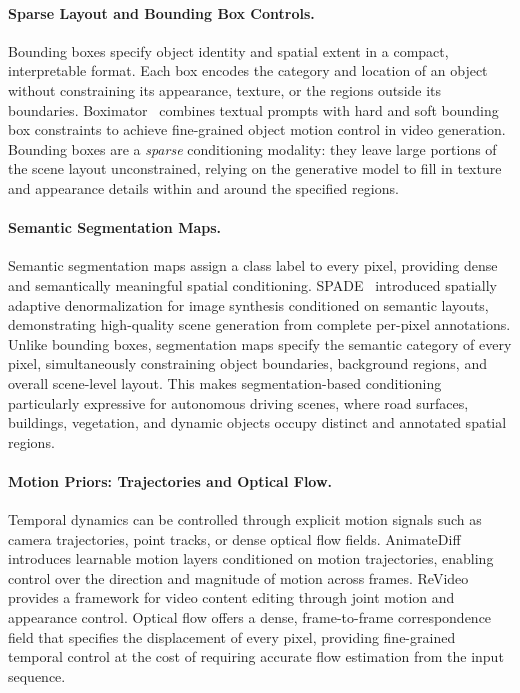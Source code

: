 \paragraph{Sparse Layout and Bounding Box Controls.}
Bounding boxes specify object identity and spatial extent in a compact, interpretable format. Each box encodes the category and location of an object without constraining its appearance, texture, or the regions outside its boundaries. Boximator~\cite{wang2024boximator} combines textual prompts with hard and soft bounding box constraints to achieve fine-grained object motion control in video generation. Bounding boxes are a \emph{sparse} conditioning modality: they leave large portions of the scene layout unconstrained, relying on the generative model to fill in texture and appearance details within and around the specified regions.

\paragraph{Semantic Segmentation Maps.}
Semantic segmentation maps assign a class label to every pixel, providing dense and semantically meaningful spatial conditioning. SPADE~\cite{park2019semantic} introduced spatially adaptive denormalization for image synthesis conditioned on semantic layouts, demonstrating high-quality scene generation from complete per-pixel annotations. Unlike bounding boxes, segmentation maps specify the semantic category of every pixel, simultaneously constraining object boundaries, background regions, and overall scene-level layout. This makes segmentation-based conditioning particularly expressive for autonomous driving scenes, where road surfaces, buildings, vegetation, and dynamic objects occupy distinct and annotated spatial regions.

\paragraph{Motion Priors: Trajectories and Optical Flow.}
Temporal dynamics can be controlled through explicit motion signals such as camera trajectories, point tracks, or dense optical flow fields. AnimateDiff~\cite{guo2024animatediff} introduces learnable motion layers conditioned on motion trajectories, enabling control over the direction and magnitude of motion across frames. ReVideo~\cite{mou2024revideo} provides a framework for video content editing through joint motion and appearance control. Optical flow offers a dense, frame-to-frame correspondence field that specifies the displacement of every pixel, providing fine-grained temporal control at the cost of requiring accurate flow estimation from the input sequence.

